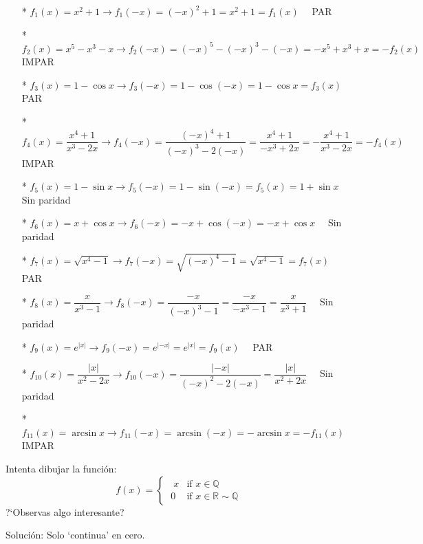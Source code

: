 {\begin{proofw}
\begin{itemize}
			\item [*] $f_1(x)=x^2+1 \to f_1(-x)=(-x)^2+1=x^2+1=f_1(x) \quad $ PAR
			\item [*]  $f_2(x)=x^5-x^3-x \to f_2(-x)=(-x)^5-(-x)^3-(-x)=-x^5+x^3+x=-f_2(x) \quad $ IMPAR
			\item [*]  $f_3(x)=1-\cos x \to f_3(-x)=1-\cos (-x)=1-\cos x=f_3(x) \quad $ PAR
			\item [*]  $f_4(x)=\dfrac {x^4+1}{x^3-2x} \to f_4(-x)=\dfrac {(-x)^4+1}{(-x)^3-2(-x)}=\dfrac {x^4+1}{-x^3+2x}=-\dfrac {x^4+1}{x^3-2x}=-f_4(x) \quad $ IMPAR 
			\item [*]  $f_5(x)=1-\sin x \to  f_5(-x)=1-\sin (-x)=f_5(x)=1+\sin x \quad $ Sin paridad
			\item [*]  $f_6(x)=x+\cos x \to f_6(-x)=-x+\cos (-x)=-x+\cos x \quad  $ Sin paridad
			\item [*]  $f_7(x)=\sqrt{x^4-1} \to f_7(-x)=\sqrt{(-x)^4-1}=\sqrt{x^4-1}=f_7(x) \quad  $ PAR
			\item [*]  $f_8(x)=\dfrac {x}{x^3-1} \to f_8(-x)=\dfrac {-x}{(-x)^3-1}=\dfrac {-x}{-x^3-1}=\dfrac {x}{x^3+1} \quad $ Sin paridad
			\item [*]  $f_9(x)=e^{|x|} \to f_9(-x)=e^{|-x|}=e^{|x|}=f_9(x) \quad $ PAR
			\item [*]  $f_{10}(x)=\dfrac {|x|}{x^2-2x} \to f_{10}(-x)=\dfrac {|-x|}{(-x)^2-2(-x)}=\dfrac {|x|}{x^2+2x} \quad $ Sin paridad
			\item [*]  $f_{11}(x)=\arcsin x \to f_{11}(-x)=\arcsin (-x)=-\arcsin x = -f_{11}(x) \quad $ IMPAR
			
		\end{itemize}

		
		\end{proofw}
		
		\begin{ejre}
		Intenta dibujar la función: 
		\begin{equation*}
		f(x)=
		\begin{cases} 
		\;\;  x &\mbox{if } x \in \mathbb{Q} \\ 
		\; 0 & \mbox{if } x \in \mathbb{R} \sim \mathbb{Q} 
		\end{cases}
		\end{equation*}
		?`Observas algo interesante?
		\end{ejre}
		
		\begin{proofw}\renewcommand{\qedsymbol}{$\diamond$}
		
		Solución: \scriptsize{Solo `continua' en cero.}
		

\end{proofw}}

